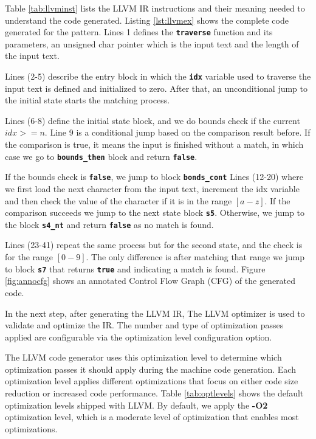 Table \ref{tab:llvminst} lists the LLVM IR instructions and their meaning needed to understand the code generated. Listing \ref{lst:llvmex} shows the complete code generated for the pattern. Lines 1 defines the \texttt{\textbf{traverse}} function and its parameters, an unsigned char pointer which is the input text and the length of the input text.

Lines (2-5) describe the entry block in which the \texttt{\textbf{idx}} variable used to traverse the input text is defined and initialized to zero. After that, an unconditional jump to the initial state starts the matching process.

Lines (6-8) define the initial state block, and we do bounds check if the current $idx >= n$. Line 9 is a conditional jump based on the comparison result before. If the comparison is true, it means the input is finished without a match, in which case we go to \texttt{\textbf{bounds\_then}} block and return \texttt{\textbf{false}}.

If the bounds check is \texttt{\textbf{false}}, we jump to block \texttt{\textbf{bonds\_cont}} Lines (12-20) where we first load the next character from the input text, increment the idx variable and then check the value of the character if it is in the range $[a - z]$. If the comparison succeeds we jump to the next state block \texttt{\textbf{s5}}. Otherwise, we jump to the block \texttt{\textbf{s4\_nt}} and return \texttt{\textbf{false}} as no match is found.

Lines (23-41) repeat the same process but for the second state, and the check is for the range $[0-9]$. The only difference is after matching that range we jump to block \texttt{\textbf{s7}} that returns \texttt{\textbf{true}} and indicating a match is found. Figure \ref{fig:annocfg} shows an annotated Control Flow Graph (CFG) of the generated code.

In the next step, after generating the LLVM IR, The LLVM optimizer is used to validate and optimize the IR. The number and type of optimization passes applied are configurable via the optimization level configuration option.

The LLVM code generator uses this optimization level to determine which optimization passes it should apply during the machine code generation. Each optimization level applies different optimizations that focus on either code size reduction or increased code performance. Table \ref{tab:optlevels} shows the default optimization levels shipped with LLVM. By default, we apply the \textbf{-O2} optimization level, which is a moderate level of optimization that enables most optimizations.

